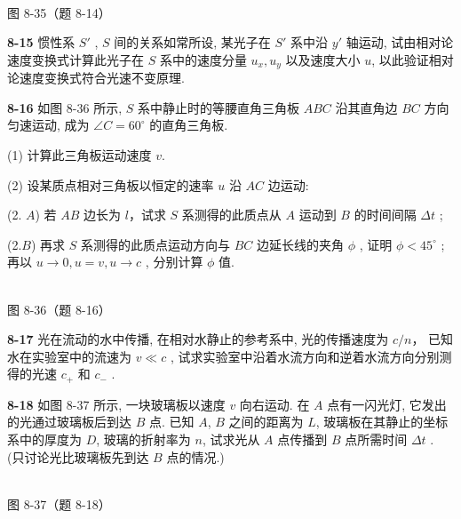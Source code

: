\begin{center}
\resizebox{0.50\textwidth}{!}{}\\[4pt]
{\small 图 8-35（题 8-14）}
\end{center}

\newpage

\textbf{8-15} 惯性系 $S'$ , $S$ 间的关系如常所设, 某光子在 $S'$ 系中沿 $y'$ 轴运动, 试由相对论速度变换式计算此光子在 $S$ 系中的速度分量 $u_{x}, u_{y}$ 以及速度大小 $u$, 以此验证相对论速度变换式符合光速不变原理.

\newpage

\textbf{8-16} 如图 8-36 所示, $S$ 系中静止时的等腰直角三角板 $ABC$ 沿其直角边 $BC$ 方向匀速运动, 成为 $\angle C = 60^{\circ}$ 的直角三角板.

(1) 计算此三角板运动速度 $v$.

(2) 设某质点相对三角板以恒定的速率 $u$ 沿 $AC$ 边运动:

(2. $A$) 若 $AB$ 边长为 $l$，试求 $S$ 系测得的此质点从 $A$ 运动到 $B$ 的时间间隔 $\Delta t$ ;

(2.$B$) 再求 $S$ 系测得的此质点运动方向与 $BC$ 边延长线的夹角 $\phi$ , 证明 $\phi < 45^{\circ}$ ; 再以 $u \to 0, u = v, u \to c$ , 分别计算 $\phi$ 值.

\begin{center}
\resizebox{0.50\textwidth}{!}{}\\[4pt]
{\small 图 8-36（题 8-16）}
\end{center}

\newpage

\textbf{8-17} 光在流动的水中传播, 在相对水静止的参考系中, 光的传播速度为 $c/n$， 已知水在实验室中的流速为 $v \ll c$ , 试求实验室中沿着水流方向和逆着水流方向分别测得的光速 $c_{+}$ 和 $c_{-}$ .

\newpage

\textbf{8-18} 如图 8-37 所示, 一块玻璃板以速度 $v$ 向右运动. 在 $A$ 点有一闪光灯, 它发出的光通过玻璃板后到达 $B$ 点. 已知 $A$, $B$ 之间的距离为 $L$, 玻璃板在其静止的坐标系中的厚度为 $D$, 玻璃的折射率为 $n$, 试求光从 $A$ 点传播到 $B$ 点所需时间 $\Delta t$ . (只讨论光比玻璃板先到达 $B$ 点的情况.)

\begin{center}
\resizebox{0.50\textwidth}{!}{}\\[4pt]
{\small 图 8-37（题 8-18）}
\end{center}

